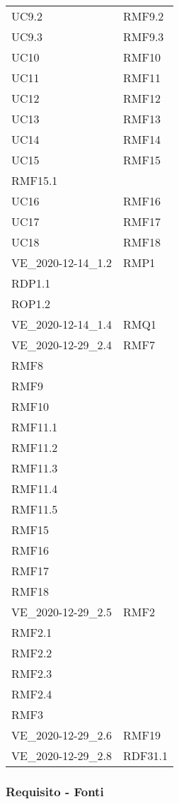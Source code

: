 \begin{longtable}[h!] { >{\centering}m{5cm} >{\centering}m{5cm} }
	 \tabularnewline
	 UC9.2 & RMF9.2
	 \tabularnewline
	 UC9.3 & RMF9.3
	 \tabularnewline
	 UC10 & RMF10
	 \tabularnewline
	 UC11 & RMF11
	 \tabularnewline
	 UC12 & RMF12
	 \tabularnewline
	 UC13 & RMF13
	 \tabularnewline
	 UC14 & RMF14
	 \tabularnewline
	 UC15 & RMF15 \\
	 RMF15.1
	 \tabularnewline
	 UC16 & RMF16
	 \tabularnewline
	 UC17 & RMF17
	 \tabularnewline
	 UC18 & RMF18
	 \tabularnewline
	 VE_2020-12-14_1.2 & RMP1 \\
	 RDP1.1 \\
	 ROP1.2
	 \tabularnewline
	 VE_2020-12-14_1.4 & RMQ1
	 \tabularnewline
	 VE_2020-12-29_2.4 & RMF7\\
	 RMF8 \\
	 RMF9 \\
	 RMF10 \\
	 RMF11.1 \\
	 RMF11.2 \\
	 RMF11.3 \\
	 RMF11.4 \\
	 RMF11.5 \\
	 RMF15 \\
	 RMF16 \\
	 RMF17 \\
	 RMF18
	 \tabularnewline
	 VE_2020-12-29_2.5 & RMF2 \\
	 RMF2.1 \\
	 RMF2.2 \\
	 RMF2.3 \\
	 RMF2.4 \\
	 RMF3
	 \tabularnewline
	 VE_2020-12-29_2.6 & RMF19
	 \tabularnewline
	 VE_2020-12-29_2.8 & RDF31.1
	 \tabularnewline

\end{longtable}

\newpage

\subsubsection{Requisito - Fonti}

